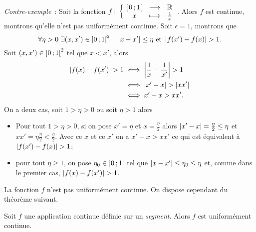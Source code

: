 \emph{Contre-exemple}~: Soit la fonction $f\colon \left\{\begin{array}{ccc} \left] 0 \, ;  1 \right[ & \longrightarrow &\mathbb{R}\\ x & \longmapsto & \frac{1}{x} \end{array} \right.$. Alors $f$ est continue, montrons qu'elle n'est pas uniformément continue. Soit $\epsilon=1$, montrons que
\begin{equation}
  \forall \eta > 0 \ \exists (x,x') \in \left] 0 \, ;  1 \right[^2 \quad \left\lvert x-x'\right\rvert \leq \eta \text{~et~} \left\lvert f(x')-f(x)\right\rvert > 1.
\end{equation}
Soit $(x,x') \in \left] 0 \, ;  1 \right[^2$ tel que $x < x'$, alors
\begin{align}
  \left\lvert f(x)-f(x')\right\rvert > 1 &\iff \left\lvert\frac{1}{x} - \frac{1}{x'}\right\rvert > 1\\
  &\iff \left\lvert x'-x\right\rvert > \left\lvert xx'\right\rvert \\
  &\iff x'-x > xx'.
\end{align}
On a deux cas, soit $1>\eta >0$ ou soit $\eta>1$ alors
\begin{itemize}
\item Pour tout $1>\eta >0$, si on pose $x'=\eta$ et $x=\frac{\eta}{2}$ alors $\left\lvert x'-x\right\rvert= \frac{\eta}{2} \leq \eta$ et $xx'= \eta \frac{\eta}{2} < \frac{\eta}{2}$. Avec ce $x$ et ce $x'$ on a $x'-x > xx'$ ce qui est équivalent à $\left\lvert f(x')-f(x)\right\rvert > 1$;
\item pour tout $\eta \geq 1$, on pose $\eta_0 \in \left] 0 \, ;  1 \right[$ tel que $\left\lvert x-x'\right\rvert \leq \eta_0 \leq \eta$ et, comme dans le premier cas, $\left\lvert f(x)-f(x')\right\rvert > 1$.
\end{itemize}
La fonction $f$ n'est pas uniformément continue. On dispose cependant du théorème suivant.
\begin{theo}
  Soit $f$ une application continue définie sur un \emph{segment}. Alors $f$ est uniformément continue.
\end{theo}
